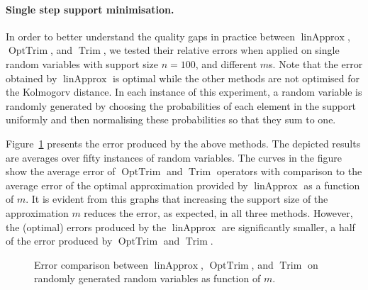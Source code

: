 \documentclass[letterpaper]{article} %
\DeclareMathOperator{\Trim}{Trim}
\DeclareMathOperator{\KlmApprox}{linApprox}
\DeclareMathOperator{\OptTrim}{OptTrim}
\begin{document}
\paragraph{Single step support minimisation.}
In order to better understand the quality gaps in practice between $\KlmApprox$, $\OptTrim$, and $\Trim$, we tested their relative errors when applied on single random variables with support size $n = 100$, and different $m$s. Note that the error obtained by $\KlmApprox$ is optimal while the other methods are not optimised for the Kolmogorv distance. In each instance of this experiment, a random variable is randomly generated by choosing the probabilities of each element in the support uniformly and then normalising these probabilities so that they sum to one.

Figure~\ref{fig:error} presents the error produced by the above methods. The depicted results are averages over fifty instances of random variables. The curves in the figure show the average error of $\OptTrim$ and $\Trim$ operators with comparison to the average error of the optimal approximation provided by $\KlmApprox$ as a function of $m$. It is evident from this graphs that increasing the support size of the approximation $m$ reduces the error, as expected, in all three methods. However, the (optimal) errors produced by the $\KlmApprox$ are significantly smaller, a half of the error produced by $\OptTrim$ and $\Trim$.


\begin{figure}[htb]
	\scriptsize	
	\centering 
	\caption{Error comparison between $\KlmApprox$, $\OptTrim$, and $\Trim$ on randomly generated random variables as function of $m$.}
	\label{fig:error}
\end{figure}
\end{document}
